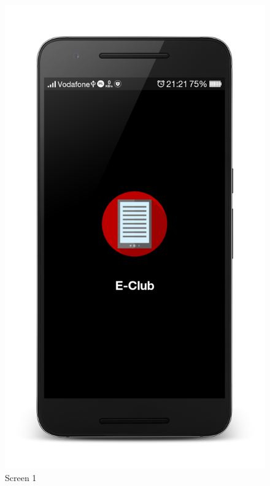\begin{figure}[ht]
\centering
\includegraphics[scale=0.06]{images/d16.png}
\caption{Screen 1}
\end{figure}

\newpage

